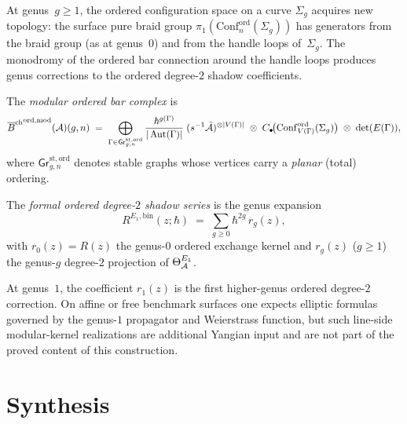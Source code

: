 \begin{construction}
At genus~$g\ge 1$, the ordered configuration space on a curve
$\Sigma_g$ acquires new topology: the surface pure braid group
$\pi_1(\mathrm{Conf}_n^{\mathrm{ord}}(\Sigma_g))$ has generators
from the braid group (as at genus~$0$) and from the handle
loops of~$\Sigma_g$. The monodromy of the ordered bar connection
around the handle loops produces genus corrections to the ordered
degree-$2$ shadow coefficients.

The \emph{modular ordered bar complex} is
\[
{\overline{B}^{\mathrm{ch}}}^{\mathrm{ord,mod}}(\mathcal{A})(g,n)
\;=\;
\bigoplus_{\Gamma\in\mathsf{Gr}^{\mathrm{st,ord}}_{g,n}}
\frac{\hbar^{g(\Gamma)}}{|\operatorname{Aut}(\Gamma)|}
\;(s^{-1}\bar{\mathcal{A}})^{\otimes|V(\Gamma)|}
\;\otimes\;
C_\bullet\!\bigl(
\mathrm{Conf}^{\mathrm{ord}}_{V(\Gamma)}(\Sigma_g)\bigr)
\;\otimes\;\det(E(\Gamma)),
\]
where $\mathsf{Gr}^{\mathrm{st,ord}}_{g,n}$ denotes stable
graphs whose vertices carry a \emph{planar} (total) ordering.

The \emph{formal ordered degree-$2$ shadow series} is the genus expansion
\begin{equation}%
R^{E_1,\mathrm{bin}}(z;\hbar)
\;=\;
\sum_{g\ge 0}\hbar^{2g}\,r_g(z),
\end{equation}
with $r_0(z)=R(z)$ the genus-$0$ ordered exchange kernel and
$r_g(z)$ ($g\ge 1$) the genus-$g$ degree-$2$ projection of
$\Theta_{\mathcal{A}}^{E_1}$.

At genus~$1$, the coefficient $r_1(z)$ is the first higher-genus
ordered degree-$2$ correction. On affine or free benchmark surfaces
one expects elliptic formulas governed by the genus-$1$ propagator and
Weierstrass function, but such line-side modular-kernel realizations
are additional Yangian input and are not part of the proved content of
this construction.
\end{construction}

\section{Synthesis}
\label{sec:v2-oackd-supplement}

